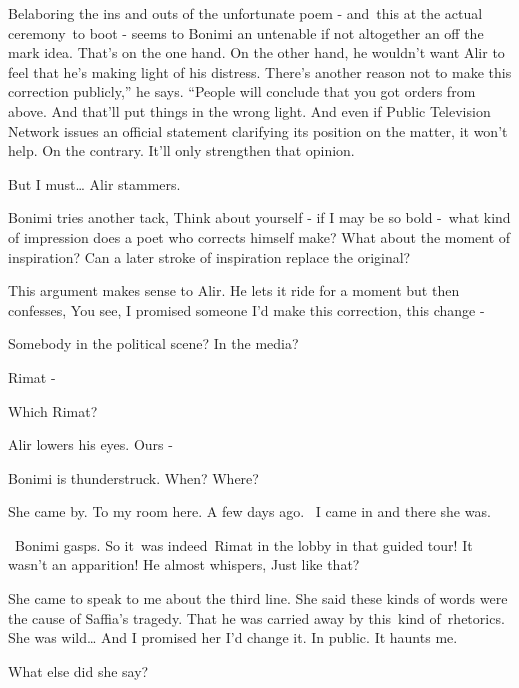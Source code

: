 \documentclass[letterpaper]{article}
\begin{document}
Belaboring the ins and outs of the unfortunate poem -  and\ this at the actual ceremony\ to boot - seems to Bonimi an
untenable if not altogether an off the mark idea. That's on the one hand. On the other hand, he wouldn't want Alir to
feel that he's making light of his distress. {\textquotedbl}There's another reason not to make this correction
publicly,'' he says. ``People will conclude that you got orders from above. And that{}'ll put things in the wrong
light. And even if Public Television Network issues an official statement clarifying its position on the matter, it
won't help. On the contrary. It'll only strengthen that opinion.{\textquotedbl} 

{\textquotedbl}But I must{\dots}{\textquotedbl} Alir stammers. 

Bonimi tries another tack, {\textquotedbl}Think about yourself - if I may be so bold -\ what kind of impression does a
poet who corrects himself make? What about the moment of inspiration? Can a later stroke of inspiration replace the
original?{\textquotedbl} 

This argument makes sense to Alir. He lets it ride for a moment but then confesses, {\textquotedbl}You see, I promised
someone I'd make this correction, this change -{\textquotedbl} 

{\textquotedbl}Somebody in the political scene? In the media?{\textquotedbl} 

{\textquotedbl}Rimat -{\textquotedbl} 

{\textquotedbl}Which Rimat?{\textquotedbl} 

Alir lowers his eyes. {\textquotedbl}Ours -{\textquotedbl} 

Bonimi is thunderstruck. {\textquotedbl}When? Where?{\textquotedbl}

{\textquotedbl}She came by. To my room here. A few days ago. ~I came in and there she was.{\textquotedbl}\ 

~Bonimi gasps. So it\ was indeed~Rimat in the lobby in that guided tour! It wasn't an apparition! He almost whispers,
{\textquotedbl}Just like that?{\textquotedbl} 

{\textquotedbl}She came to speak to me about the third line. She said these kinds of words were the cause of Saffia's
tragedy. That he was carried away by this~kind of\textcolor{red}{\ }rhetorics. She was wild{\dots} And I promised her
I'd change it. In public. It haunts me.{\textquotedbl} 

{\textquotedbl}What else did she say?{\textquotedbl} 
\end{document}
